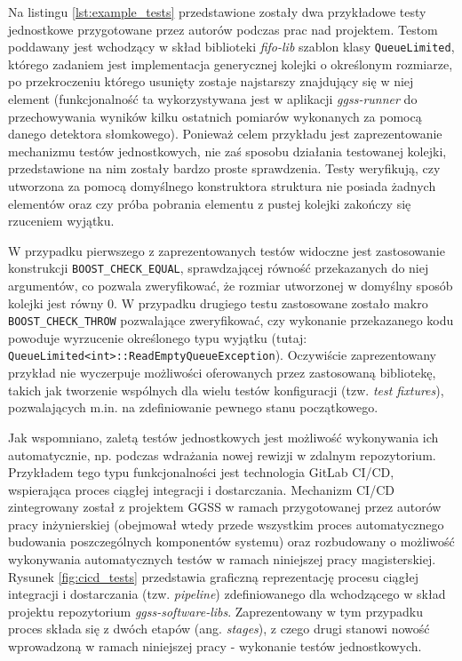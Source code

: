 Na listingu \ref{lst:example_tests} przedstawione zostały dwa przykładowe testy jednostkowe przygotowane przez autorów podczas prac nad projektem. Testom poddawany jest wchodzący w skład biblioteki \emph{fifo-lib} szablon klasy \lstinline{QueueLimited}, którego zadaniem jest implementacja generycznej kolejki o określonym rozmiarze, po przekroczeniu którego usunięty zostaje najstarszy znajdujący się w niej element (funkcjonalność ta wykorzystywana jest w aplikacji \emph{ggss-runner} do przechowywania wyników kilku ostatnich pomiarów wykonanych za pomocą danego detektora słomkowego). Ponieważ celem przykładu jest zaprezentowanie mechanizmu testów jednostkowych, nie zaś sposobu działania testowanej kolejki, przedstawione na nim zostały bardzo proste sprawdzenia. Testy weryfikują, czy utworzona za pomocą domyślnego konstruktora struktura nie posiada żadnych elementów oraz czy próba pobrania elementu z pustej kolejki zakończy się rzuceniem wyjątku.



W przypadku pierwszego z zaprezentowanych testów widoczne jest zastosowanie konstrukcji \lstinline{BOOST_CHECK_EQUAL}, sprawdzającej równość przekazanych do niej argumentów, co pozwala zweryfikować, że rozmiar utworzonej w domyślny sposób kolejki jest równy 0. W przypadku drugiego testu zastosowane zostało makro \lstinline{BOOST_CHECK_THROW} pozwalające zweryfikować, czy wykonanie przekazanego kodu powoduje wyrzucenie określonego typu wyjątku (tutaj: \lstinline{QueueLimited<int>::ReadEmptyQueueException}). Oczywiście zaprezentowany przykład nie wyczerpuje możliwości oferowanych przez zastosowaną bibliotekę, takich jak tworzenie wspólnych dla wielu testów konfiguracji (tzw. \emph{test fixtures}), pozwalających m.in. na zdefiniowanie pewnego stanu początkowego.

Jak wspomniano, zaletą testów jednostkowych jest możliwość wykonywania ich automatycznie, np. podczas wdrażania nowej rewizji w zdalnym repozytorium. Przykładem tego typu funkcjonalności jest technologia GitLab CI/CD, wspierająca proces ciągłej integracji i dostarczania. Mechanizm CI/CD zintegrowany został z projektem GGSS w ramach przygotowanej przez autorów pracy inżynierskiej (obejmował wtedy przede wszystkim proces automatycznego budowania poszczególnych komponentów systemu) oraz rozbudowany o możliwość wykonywania automatycznych testów w ramach niniejszej pracy magisterskiej. Rysunek \ref{fig:cicd_tests} przedstawia graficzną reprezentację procesu ciągłej integracji i dostarczania (tzw. \emph{pipeline}) zdefiniowanego dla wchodzącego w skład projektu repozytorium \emph{ggss-software-libs}. Zaprezentowany w tym przypadku proces składa się z dwóch etapów (ang. \emph{stages}), z czego drugi stanowi nowość wprowadzoną w ramach niniejszej pracy - wykonanie testów jednostkowych. 

